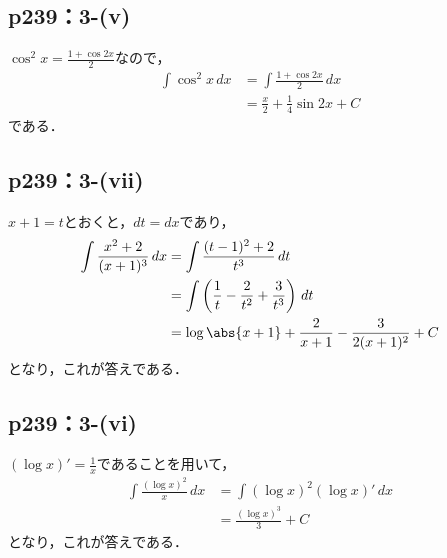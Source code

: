 \documentclass[uplatex,dvipdfmx,a4paper,10pt,fleqn]{jsarticle}
\begin{document}
\subsection*{p239：3-(v)}

\begin{tleftbar}
    $\cos ^2 x = \frac{1+\cos 2x}{2}$なので，
    \begin{align*}
        \int \cos ^2 x \, dx & = \int \frac{1+\cos 2x}{2} \, dx \\
        & = \frac{x}{2}+\frac{1}{4} \sin 2x + C
    \end{align*}
    である．
\end{tleftbar}

\newpage 

\subsection*{p239：3-(vii)}

\begin{tleftbar}
    $x+1 =t$とおくと，$dt=dx$であり，
    \begin{align*}
        \int \frac{x^2+2}{(x+1)^3} \, dx & = \int \frac{(t-1)^2+2}{t^3} \, dt \\
        & = \int \left (\frac{1}{t}-\frac{2}{t^2}+\frac{3}{t^3}\right) \, dt \\
        & = \log \abs{x+1}+\frac{2}{x+1}-\frac{3}{2(x+1)^2}+C
    \end{align*}
    となり，これが答えである．
\end{tleftbar}

\subsection*{p239：3-(vi)}

\begin{tleftbar}
    $(\log x)' = \frac{1}{x}$であることを用いて，
    \begin{align*}
        \int \frac{(\log x)^2}{x} \, dx & = \int (\log x)^2 (\log x)' \, dx \\
        & = \frac{(\log x)^3}{3} + C
    \end{align*}
    となり，これが答えである．
\end{tleftbar}
\end{document}
